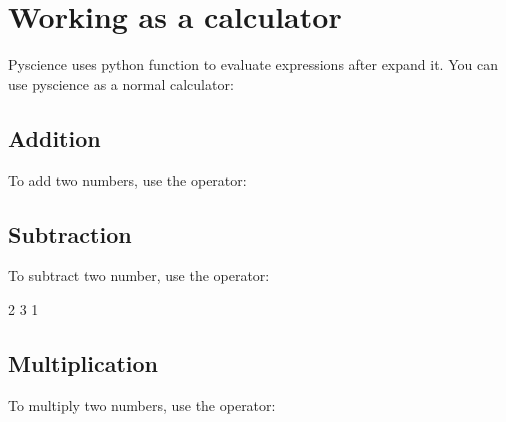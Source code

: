 \documentclass[letterpaper,10pt,english]{sphinxmanual}
\begin{document}
\section{Working as a calculator}
\label{\detokenize{user_guide:working-as-a-calculator}}
Pyscience uses python  function to evaluate expressions after expand it.
You can use pyscience as a normal calculator:

\begin{sphinxVerbatim}[commandchars=\\\{\}]
   
     
 
\end{sphinxVerbatim}


\subsection{Addition}
\label{\detokenize{user_guide:addition}}
To add two numbers, use the \sphinxcode{\sphinxupquote{+}} operator:

\begin{sphinxVerbatim}[commandchars=\\\{\}]
   
\end{sphinxVerbatim}


\subsection{Subtraction}
\label{\detokenize{user_guide:subtraction}}
To subtract two number, use the \sphinxcode{\sphinxupquote{-}} operator:

\begin{sphinxVerbatim}[commandchars=\\\{\}]
\PYGZgt{} 2 \textendash{} 3
\PYGZhy{}1
\end{sphinxVerbatim}


\subsection{Multiplication}
\label{\detokenize{user_guide:multiplication}}
To multiply two numbers, use the \sphinxcode{\sphinxupquote{*}} operator:

\begin{sphinxVerbatim}[commandchars=\\\{\}]
   
\end{sphinxVerbatim}
\end{document}
